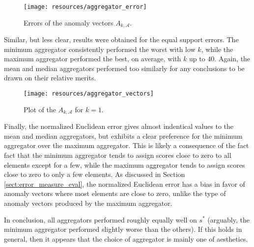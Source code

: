 \begin{figure}[!ht]
    \vspace{-5pt}
    \begin{center}
        \texttt{[image: resources/aggregator\_error]}
    \end{center}
    \vspace{-18pt}
    \caption{\small{Errors of the anomaly vectors $A_{k, \mathcal{A}}$.}}
    \label{fig:aggregator_error}
    \vspace{-10pt}
\end{figure}

Similar, but less clear, results were obtained for the equal support errors. The minimum aggregator consistently performed the worst with low $k$, while the maximum aggregator performed the best, on average, with $k$ up to $40$. Again, the mean and median aggregators performed too similarly for any conclusions to be drawn on their relative merits.

\begin{wrapfigure}{r}{0.49\textwidth}
    \vspace{-20pt}
    \begin{center}
        \texttt{[image: resources/aggregator\_vectors]}
    \end{center}
    \vspace{-20pt}
    \caption{\small{Plot of the $A_{k, \mathcal{A}}$ for $k=1$.}}
    \vspace{-0pt}
    \label{fig:aggregator_vectors}
\end{wrapfigure}

Finally, the normalized Euclidean error gives almost indentical values to the mean and median aggregators, but exhibits a clear preference for the minimum aggregator over the maximum aggregator. This is likely a consequence of the fact fact that the minimum aggregator tends to assign scores close to zero to all elements except for a few, while the maximum aggregator tends to assign scores close to zero to only a few elements. As discussed in Section \ref{sect:error_measure_eval}, the normalized Euclidean error has a bias in favor of anomaly vectors where most elements are close to zero, unlike the type of anomaly vectors produced by the maximum aggregator. 

In conclusion, all aggregators performed roughly equally well on $s^*$ (arguably, the minimum aggregator performed slightly worse than the others). If this holds in general, then it appears that the choice of aggregator is mainly one of aesthetics.

